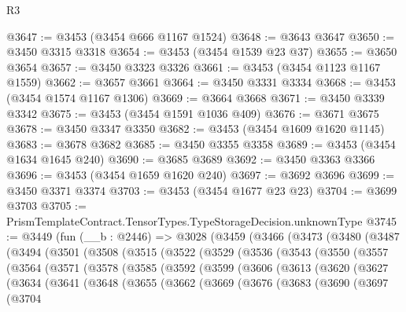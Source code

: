\begin{lexlean}{R3}
\begin{coremodule}
@3647 := @3453 (@3454 @666 @1167 @1524)
@3648 := @3643 @3647
@3650 := @3450 @3315 @3318
@3654 := @3453 (@3454 @1539 @23 @37)
@3655 := @3650 @3654
@3657 := @3450 @3323 @3326
@3661 := @3453 (@3454 @1123 @1167 @1559)
@3662 := @3657 @3661
@3664 := @3450 @3331 @3334
@3668 := @3453 (@3454 @1574 @1167 @1306)
@3669 := @3664 @3668
@3671 := @3450 @3339 @3342
@3675 := @3453 (@3454 @1591 @1036 @409)
@3676 := @3671 @3675
@3678 := @3450 @3347 @3350
@3682 := @3453 (@3454 @1609 @1620 @1145)
@3683 := @3678 @3682
@3685 := @3450 @3355 @3358
@3689 := @3453 (@3454 @1634 @1645 @240)
@3690 := @3685 @3689
@3692 := @3450 @3363 @3366
@3696 := @3453 (@3454 @1659 @1620 @240)
@3697 := @3692 @3696
@3699 := @3450 @3371 @3374
@3703 := @3453 (@3454 @1677 @23 @23)
@3704 := @3699 @3703
@3705 := PrismTemplateContract.TensorTypes.TypeStorageDecision.unknownType
@3745 := @3449
    (fun (__b : @2446) =>
    @3028
      (@3459
        (@3466
          (@3473
            (@3480
              (@3487
                (@3494
                  (@3501
                    (@3508
                      (@3515
                        (@3522
                          (@3529
                            (@3536
                              (@3543
                                (@3550
                                  (@3557
                                    (@3564
                                      (@3571
                                        (@3578
                                          (@3585
                                            (@3592
                                              (@3599
                                                (@3606
                                                  (@3613
                                                    (@3620
                                                      (@3627
                                                        (@3634
                                                          (@3641
                                                            (@3648
                                                              (@3655
                                                                (@3662
                                                                  (@3669
                                                                    (@3676
                                                                      (@3683
                                                                        (@3690
                                                                          (@3697
                                                                            (@3704

\end{coremodule}
\end{lexlean}
